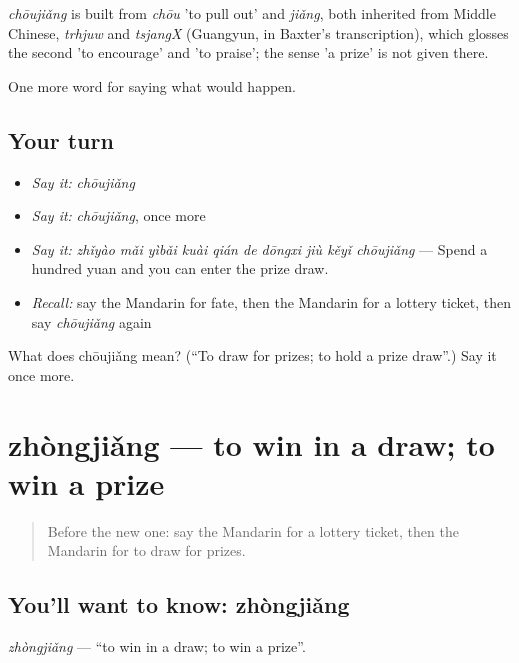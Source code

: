 \begin{cousinweb}
\emph{chōujiǎng} is built from \emph{chōu} 'to pull out' and \emph{jiǎng}, both inherited from Middle Chinese, \emph{trhjuw} and \emph{tsjangX} (Guangyun, in Baxter's transcription), which glosses the second 'to encourage' and 'to praise'; the sense 'a prize' is not given there.
\end{cousinweb}

\begin{grammarlens}[title={What you've built}]
One more word for saying what would happen.
\end{grammarlens}

\subsection*{Your turn}
\begin{itemize}
\raggedright
  \item \emph{Say it:} \emph{chōujiǎng}
  \item \emph{Say it:} \emph{chōujiǎng}, once more
  \item \emph{Say it:} \emph{zhǐyào mǎi yìbǎi kuài qián de dōngxi jiù kěyǐ chōujiǎng} — Spend a hundred yuan and you can enter the prize draw.
  \item \emph{Recall:} say the Mandarin for fate, then the Mandarin for a lottery ticket, then say \emph{chōujiǎng} again
\end{itemize}

\begin{tcolorbox}[breakable,colback=teal!4,colframe=teal!35!black,title={Before you move on}]
What does chōujiǎng mean? (\textquotedblleft{}To draw for prizes; to hold a prize draw\textquotedblright{}.) Say it once more.
\end{tcolorbox}
\section[zhòngjiǎng]{zhòngjiǎng — to win in a draw; to win a prize}

\label{lesson:ZH-C530-zhongjiang}



\begin{quote}
Before the new one: say the Mandarin for a lottery ticket, then the Mandarin for to draw for prizes.
\end{quote}

\subsection*{You'll want to know: zhòngjiǎng}
\emph{zhòngjiǎng} — \textquotedblleft{}to win in a draw; to win a prize\textquotedblright{}.

